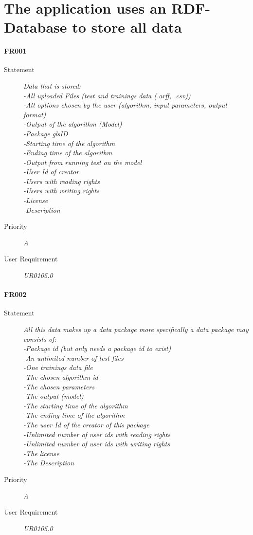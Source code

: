 \section{The application uses an RDF-Database to store all data}

\paragraph{FR001}
\begin{description}
\item [Statement] \textit{
 Data that is stored:  
	\\-All uploaded Files (test and trainings data (.\gls{arff}, .\gls{csv}))
	\\-All options chosen by the user (algorithm, input parameters, output format)
	\\-Output of the algorithm (\gls{Model})
	\\-Package gls{ID}
	\\-Starting time of the algorithm
	\\-Ending time of the algorithm
	\\-Output from running test on the model
	\\-User Id of creator
	\\-Users with reading rights
	\\-Users with writing rights
	\\-License
	\\-Description
}
\item [Priority] \textit{A}
\item[User Requirement] \textit{UR0105.0}
\end{description}

\paragraph{FR002}
\begin{description}
\item [Statement] \textit{
 All this data makes up a data package more specifically a data package may consists of:  
	\\-Package id (but only needs a package id to exist)
	\\-An unlimited number of test files
	\\-One trainings data file
	\\-The chosen algorithm id
	\\-The chosen parameters
	\\-The output (model)
	\\-The starting time of the algorithm
	\\-The ending time of the algorithm
	\\-The user Id of the creator of this package
	\\-Unlimited number of user ids with reading rights
	\\-Unlimited number of user ids with writing rights
	\\-The license
	\\-The Description
}
\item [Priority] \textit{A}
\item[User Requirement] \textit{UR0105.0}
\end{description}

